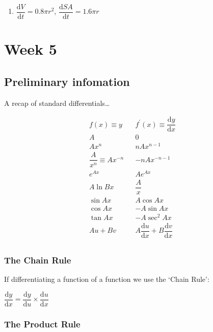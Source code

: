 \documentclass[
]{book}
\providecommand{\tightlist}{%
  \setlength{\itemsep}{0pt}\setlength{\parskip}{0pt}}
\begin{document}
\begin{enumerate}
\def\labelenumi{\arabic{enumi}.}
\setcounter{enumi}{2}
\tightlist
\item
  \(\dfrac{\textrm{d}V}{\textrm{d}t}= 0.8 \pi r^2\), \(\dfrac{\textrm{d}SA}{\textrm{d}t}=1.6 \pi r\)
\end{enumerate}

\hypertarget{ch:Workshop5}{%
\chapter{Week 5}\label{ch:Workshop5}}

\hypertarget{sec:Prelim5}{%
\section{Preliminary infomation}\label{sec:Prelim5}}

A recap of standard differentials\ldots{}

\begin{equation*}
\begin{array}{ccc}
  f(x) \equiv y & & f^{\prime}(x) \equiv \dfrac{\textrm{d}y}{\textrm{d}x}\\
  \hline
A & &0 \\
 Ax^n & &nAx^{n-1} \\
 \dfrac{A}{x^n} \equiv A x^{-n} & &-nA x^{-n-1} \\
e^{Ax} & &Ae^{Ax} \\
A \ln Bx & &\dfrac{A}{x} \\
\sin Ax & &A\cos Ax \\
\cos Ax & &-A\sin Ax \\
\tan Ax & &-A\sec^2 Ax \\
Au + Bv & &A\dfrac{\textrm{d}u}{\textrm{d}x} + B\dfrac{\textrm{d}v}{\textrm{d}x} \\
\end{array}
\end{equation*}

\hypertarget{subsec:chainrule}{%
\subsection{The Chain Rule}\label{subsec:chainrule}}

If differentiating a function of a function we use the `Chain Rule':

\(\dfrac{\textrm{d}y}{\textrm{d}x}=\dfrac{\textrm{d}y}{\textrm{d}u} \times \dfrac{\textrm{d}u}{\textrm{d}x}\)

\hypertarget{subsec:productrule}{%
\subsection{The Product Rule}\label{subsec:productrule}}
\end{document}
